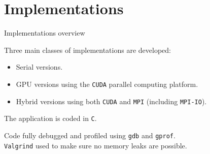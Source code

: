 \documentclass[10pt]{beamer}
\begin{document}
\section{Implementations}

\begin{frame}{Implementations overview}
	
Three main classes of implementations are developed:
\begin{itemize}
	\vspace{-0.2cm}
	\item Serial versions.
	\item GPU versions using the \texttt{CUDA} parallel computing platform.
	\item Hybrid versions using both \texttt{CUDA} and \texttt{MPI} (including \texttt{MPI-IO}).\\[20pt]
\end{itemize}

The application is coded in \texttt{C}.

Code fully debugged and profiled using \texttt{gdb} and \texttt{gprof}.\\
\texttt{Valgrind} used to make sure no memory leaks are possible. 

\end{frame}
\end{document}
